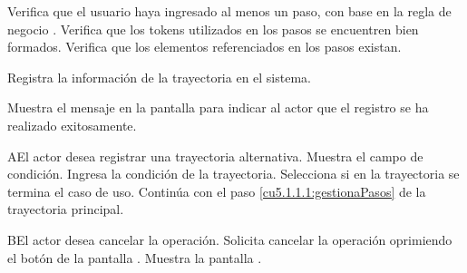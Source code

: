 \begin{UCtrayectoria}
	\UCpaso[\UCsist] Verifica que el usuario haya ingresado al menos un paso, con base en la regla de negocio . 
	\UCpaso[\UCsist] Verifica que los tokens utilizados en los pasos se encuentren bien formados. 
	\UCpaso[\UCsist] Verifica que los elementos referenciados en los pasos existan. 
	
	\UCpaso[\UCsist] Registra la información de la trayectoria en el sistema.
	
	\UCpaso[\UCsist] Muestra el mensaje  en la pantalla  
	para indicar al actor que el registro se ha realizado exitosamente.
    
\end{UCtrayectoria}
 \begin{UCtrayectoriaA}{A}{El actor desea registrar una trayectoria alternativa.}
    \UCpaso[\UCsist] Muestra el campo de condición.
    \UCpaso[\UCactor] Ingresa la condición de la trayectoria.
    \UCpaso[\UCactor] Selecciona si en la trayectoria se termina el caso de uso.
    \UCpaso[] Continúa con el paso \ref{cu5.1.1.1:gestionaPasos} de la trayectoria principal.
 \end{UCtrayectoriaA}
 \begin{UCtrayectoriaA}{B}{El actor desea cancelar la operación.}
    \UCpaso[\UCactor] Solicita cancelar la operación oprimiendo el botón  de la pantalla .
    \UCpaso[\UCsist] Muestra la pantalla .
 \end{UCtrayectoriaA}
 

